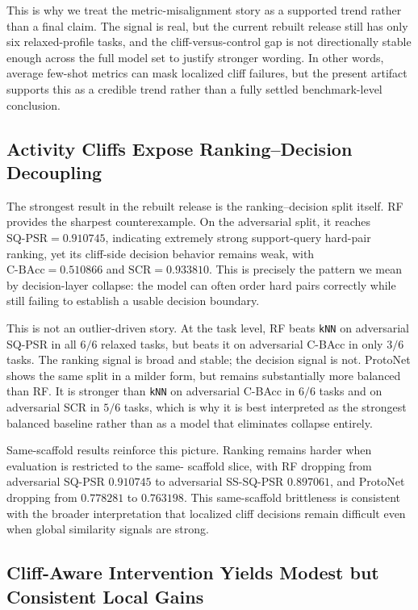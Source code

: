 \documentclass{article}
\begin{document}
This is why we treat the metric-misalignment story as a supported trend rather than a final claim. The signal is
real, but the current rebuilt release still has only six relaxed-profile tasks, and the cliff-versus-control gap
is not directionally stable enough across the full model set to justify stronger wording. In other words, average
few-shot metrics can mask localized cliff failures, but the present artifact supports this as a credible trend
rather than a fully settled benchmark-level conclusion.

\subsection{Activity Cliffs Expose Ranking--Decision Decoupling}

The strongest result in the rebuilt release is the ranking--decision split itself. RF provides the sharpest
counterexample. On the adversarial split, it reaches $\mathrm{SQ\mbox{-}PSR}=0.910745$, indicating extremely
strong support-query hard-pair ranking, yet its cliff-side decision behavior remains weak, with
$\mathrm{C\mbox{-}BAcc}=0.510866$ and $\mathrm{SCR}=0.933810$. This is precisely the pattern we mean by
decision-layer collapse: the model can often order hard pairs correctly while still failing to establish a usable
decision boundary.

This is not an outlier-driven story. At the task level, RF beats \texttt{kNN} on adversarial SQ-PSR in all
$6/6$ relaxed tasks, but beats it on adversarial C-BAcc in only $3/6$ tasks. The ranking signal is broad and
stable; the decision signal is not. ProtoNet shows the same split in a milder form, but remains substantially more
balanced than RF. It is stronger than \texttt{kNN} on adversarial C-BAcc in $6/6$ tasks and on adversarial SCR in
$5/6$ tasks, which is why it is best interpreted as the strongest balanced baseline rather than as a model that
eliminates collapse entirely.

Same-scaffold results reinforce this picture. Ranking remains harder when evaluation is restricted to the same-
scaffold slice, with RF dropping from adversarial SQ-PSR $0.910745$ to adversarial SS-SQ-PSR $0.897061$, and
ProtoNet dropping from $0.778281$ to $0.763198$. This same-scaffold brittleness is consistent with the broader
interpretation that localized cliff decisions remain difficult even when global similarity signals are strong.

\subsection{Cliff-Aware Intervention Yields Modest but Consistent Local Gains}
\end{document}

